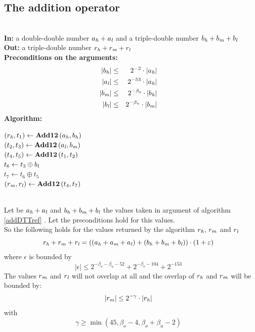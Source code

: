 \subsection{The addition operator \AddDTT}
\begin{algorithm}[\AddDTT] \label{addDTTref} ~ \\
{\bf In:} a double-double number $a_{\mathit{h}} + a_{\mathit{l}}$ and a triple-double number $b_{\mathit{h}} + b_{\mathit{m}} + b_{\mathit{l}}$ \\
{\bf Out:} a triple-double number $r_{\mathit{h}} + r_{\mathit{m}} + r_{\mathit{l}}$ \\
{\bf Preconditions on the arguments:}
\begin{eqnarray*}
\left \vert b_{\mathit{h}} \right \vert & \leq & 2^{-2} \cdot \left \vert a_{\mathit{h}} \right \vert \\
\left \vert a_{\mathit{l}} \right \vert & \leq & 2^{-53} \cdot \left \vert a_{\mathit{h}} \right \vert \\
\left \vert b_{\mathit{m}} \right \vert & \leq & 2^{-\beta_o} \cdot \left \vert b_{\mathit{h}} \right \vert \\
\left \vert b_{\mathit{l}} \right \vert & \leq & 2^{-\beta_u} \cdot \left \vert b_{\mathit{m}} \right \vert 
\end{eqnarray*}
{\bf Algorithm:} \\
\begin{center}
\begin{minipage}[b]{50mm}
$\left( r_{\mathit{h}}, t_1 \right) \gets \mathbf{Add12}\left( a_{\mathit{h}}, b_{\mathit{h}} \right)$ \\
$\left( t_2, t_3 \right) \gets \mathbf{Add12}\left( a_{\mathit{l}}, b_{\mathit{m}} \right)$ \\
$\left( t_4, t_5 \right) \gets \mathbf{Add12}\left( t_1, t_2 \right)$ \\
$t_6 \gets t_3 \oplus b_{\mathit{l}}$ \\
$t_7 \gets t_6 \oplus t_5$ \\
$\left( r_{\mathit{m}}, r_{\mathit{l}} \right) \gets \mathbf{Add12}\left( t_4, t_7 \right)$ \\
\end{minipage}
\end{center}
\end{algorithm}
\begin{theorem} ~ \\
Let be $a_{\mathit{h}} + a_{\mathit{l}}$ and $b_{\mathit{h}} + b_{\mathit{m}} + b_{\mathit{l}}$ the values taken in argument of algorithm \ref{addDTTref} \AddDTT. 
Let the preconditions hold for this values.\\
So the following holds for the values returned by the algorithm $r_{\mathit{h}}$, $r_{\mathit{m}}$ and $r_{\mathit{l}}$ 
$$r_{\mathit{h}} + r_{\mathit{m}} + r_{\mathit{l}} = \left(\left(a_{\mathit{h}} + a_{\mathit{m}} + a_{\mathit{l}} \right) + \left( b_{\mathit{h}} + b_{\mathit{m}} + b_{\mathit{l}} \right)\right) \cdot \left(1 + \varepsilon\right)$$
where $\epsilon$ is bounded by
$$\left \vert \epsilon \right \vert \leq 2^{-\beta_o - \beta_u - 52} + 2^{-\beta_o - 104} + 2^{-153}$$
The values $r_{\mathit{m}}$ and $r_{\mathit{l}}$ will not overlap at all and the overlap of $r_{\mathit{h}}$ and $r_{\mathit{m}}$ will be bounded by:
$$\left \vert r_{\mathit{m}} \right \vert \leq 2^{-\gamma} \cdot \left \vert r_{\mathit{h}} \right \vert$$
with
$$\gamma \geq \min\left( 45, \beta_o - 4, \beta_o + \beta_u - 2 \right)$$
\end{theorem}

